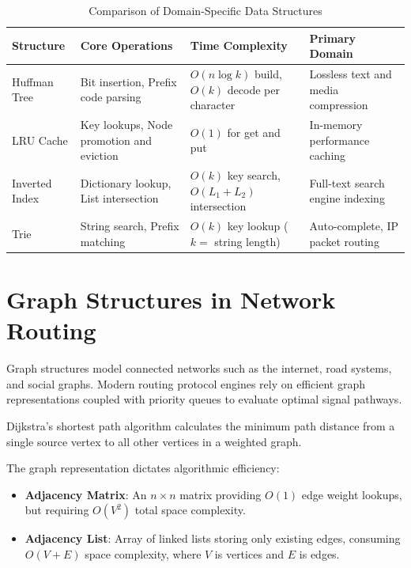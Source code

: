 \documentclass[12pt]{report}
\begin{document}
\begin{table}[htbp]
\centering
\caption{Comparison of Domain-Specific Data Structures}
\label{tab:ds_comparison}
\begin{tabularx}{\textwidth}{@{} >{\raggedright\arraybackslash}p{2.5cm} >{\raggedright\arraybackslash}p{3cm} >{\raggedright\arraybackslash}p{3cm} >{\raggedright\arraybackslash}X @{}}
\toprule
\textbf{Structure} & \textbf{Core Operations} & \textbf{Time Complexity} & \textbf{Primary Domain} \\
\midrule
Huffman Tree & Bit insertion, Prefix code parsing & $O(n \log k)$ build, $O(k)$ decode per character & Lossless text and media compression \\
\addlinespace
LRU Cache & Key lookups, Node promotion and eviction & $O(1)$ for get and put & In-memory performance caching \\
\addlinespace
Inverted Index & Dictionary lookup, List intersection & $O(k)$ key search, $O(L_1 + L_2)$ intersection & Full-text search engine indexing \\
\addlinespace
Trie & String search, Prefix matching & $O(k)$ key lookup ($k =$ string length) & Auto-complete, IP packet routing \\
\bottomrule
\end{tabularx}
\end{table}

\section{Graph Structures in Network Routing}

Graph structures model connected networks such as the internet, road systems, and social graphs. Modern routing protocol engines rely on efficient graph representations coupled with priority queues to evaluate optimal signal pathways.

Dijkstra's shortest path algorithm calculates the minimum path distance from a single source vertex to all other vertices in a weighted graph.

The graph representation dictates algorithmic efficiency:
\begin{itemize}
    \item \textbf{Adjacency Matrix}: An $n \times n$ matrix providing $O(1)$ edge weight lookups, but requiring $O(V^2)$ total space complexity.
    \item \textbf{Adjacency List}: Array of linked lists storing only existing edges, consuming $O(V + E)$ space complexity, where $V$ is vertices and $E$ is edges.
\end{itemize}
\end{document}
